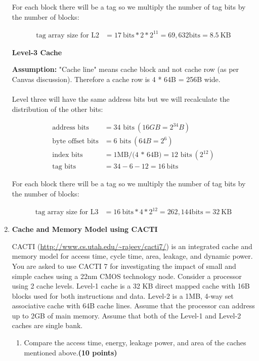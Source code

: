 \documentclass[a4paper, 11pt]{exam}
\begin{document}
\begin{enumerate}
For each block there will be a tag so we multiply the number of tag bits by the number of blocks:

\begin{align*}
\text{tag array size for L2} &= 17 \ \text{bits} * 2 * 2^{11} = 69,632 \text{bits} = 8.5 \ \text{KB} 	
\end{align*}

\textbf{Level-3 Cache}

\textbf{Assumption:} "Cache line" means cache block and not cache row (as per Canvas discussion). Therefore a cache row is 4 * 64B = 256B wide.\\ \\

Level three will have the same address bits but we will recalculate the distribution of the other bits:

\begin{align*}
\text{address bits} &= \text{34 bits} \  (16GB = 2^{34} B) \\
\text{byte offset bits} &= \text{6 bits} \ (64B = 2^6) \\
\text{index bits} &= \text{1MB/(4 * 64B)} = \text{12 bits} \ (2^{12})\\
\text{tag bits} &= 34 - 6 - 12 =  16 \ \text{bits}         
\end{align*}

For each block there will be a tag so we multiply the number of tag bits by the number of blocks:

\begin{align*}
\text{tag array size for L3} &= 16 \ \text{bits} * 4 * 2^{12} = 262,144 \text{bits} = 32 \ \text{KB} 	
\end{align*}


\item \textbf{Cache and Memory Model using CACTI }

CACTI (\url{http://www.cs.utah.edu/~rajeev/cacti7/}) is an integrated cache and memory model for access time, cycle time, area, leakage, and dynamic power. You are asked to use CACTI 7 for investigating the impact of small and simple caches using a 22nm CMOS technology node. Consider a processor using 2 cache levels. Level-1 cache is a 32 KB direct mapped cache with 16B blocks used for both instructions and data. Level-2 is a 1MB, 4-way set associative cache with 64B cache lines. Assume that the processor can address up to 2GB of main memory. Assume that both of the Level-1 and Level-2 caches are single bank.
\begin{enumerate}
	\item Compare the access time, energy, leakage power, and area of the caches mentioned above.\textbf{(10 points)} 
	

\end{enumerate}
\end{enumerate}
\end{document}
